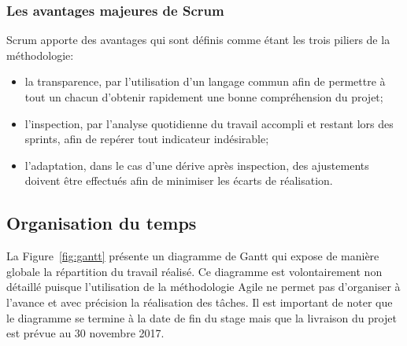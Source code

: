 \documentclass{tnreport}
\begin{document}
\subsubsection{Les avantages majeures de Scrum}

Scrum apporte des avantages qui sont définis comme étant les trois piliers de la méthodologie:
\begin{itemize}
	\item la transparence, par l'utilisation d'un langage commun afin de permettre à tout un chacun d'obtenir rapidement une bonne compréhension du projet; 
	\item l'inspection, par l'analyse quotidienne du travail accompli et restant lors des sprints, afin de repérer tout indicateur indésirable;
	\item l'adaptation, dans le cas d'une dérive après inspection, des ajustements doivent être effectués afin de minimiser les écarts de réalisation.
\end{itemize}

\subsection{Organisation du temps}

La Figure~\ref{fig:gantt} présente un diagramme de Gantt qui expose de manière globale la répartition du travail réalisé. Ce diagramme est volontairement non détaillé puisque l'utilisation de la méthodologie Agile ne permet pas d'organiser à l'avance et avec précision la réalisation des tâches. Il est important de noter que le diagramme se termine à la date de fin du stage mais que la livraison du projet est prévue au 30 novembre 2017.
\end{document}
